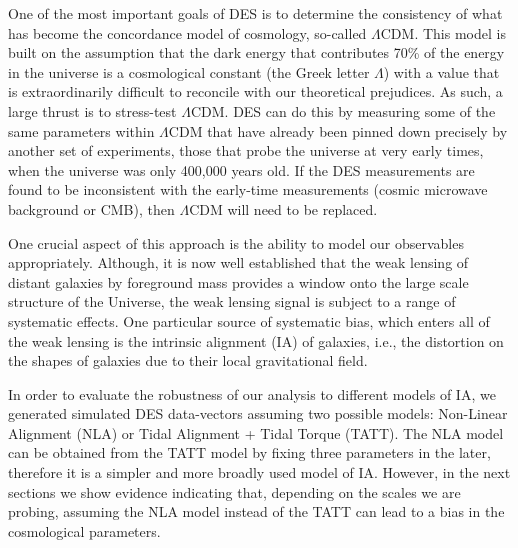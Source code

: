 \documentclass[12pt]{article}
\begin{document}
\begin{small}
One of the most important goals of DES is to determine the consistency of what has become the concordance model of cosmology, so-called $\Lambda$CDM. This model is built on the assumption that the dark energy that contributes 70\% of the energy in the universe is a cosmological constant (the Greek letter $\Lambda$) with a value that is extraordinarily difficult to reconcile with our theoretical prejudices. As such, a large thrust is to stress-test $\Lambda$CDM. DES can do this by measuring some of the same parameters within $\Lambda$CDM that have already been pinned down precisely by another set of experiments, those that probe the universe at very early times, when the universe was only 400,000 years old. If the DES measurements are found to be inconsistent with the early-time measurements (cosmic microwave background or CMB), then $\Lambda$CDM will need to be replaced.

One crucial aspect of this approach is the ability to model our observables appropriately. Although, it is now well established that the weak lensing of distant galaxies by foreground mass provides a window onto the large scale structure of the Universe, the weak lensing signal is subject to a range of systematic effects. One particular source of systematic bias, which enters all of the weak lensing is the intrinsic alignment (IA) of galaxies, i.e., the distortion on the shapes of galaxies due to their local gravitational field.

In order to evaluate the robustness of our analysis to different models of IA, we generated simulated DES data-vectors assuming two possible models: Non-Linear Alignment (NLA) or Tidal Alignment + Tidal Torque (TATT). The NLA model can be obtained from the TATT model by fixing three parameters in the later, therefore it is a simpler and more broadly used model of IA. However, in the next sections we show evidence indicating that, depending on the scales we are probing, assuming the NLA model instead of the TATT can lead to a bias in the cosmological parameters.  
%



\end{small}
\end{document}
